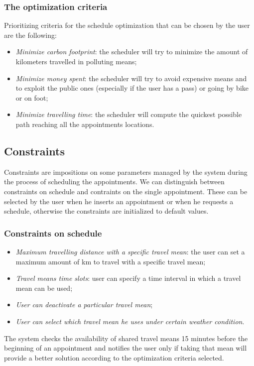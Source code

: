  
\subsubsection{The optimization criteria} \label{subsubsect:optcriteria} 
Prioritizing criteria for the schedule optimization that can be chosen by the user are the following:
\begin{itemize}
\item \textit{Minimize carbon footprint}: the scheduler will try to minimize the amount of kilometers travelled in polluting means;
\item \textit{Minimize money spent}: the scheduler will try to avoid expensive means and to exploit the public ones (especially if the user has a pass) or going by bike or on foot;
\item \textit{Minimize travelling time}: the scheduler will compute the quickest possible path reaching all the appointments locations.
\end{itemize}

\subsection{Constraints}
Constraints are impositions on some parameters managed by the system during the process of scheduling the appointments. We can distinguish between constraints on schedule and contraints on the single appointment. These can be selected by the user when he inserts an appointment or when he requests a schedule, otherwise the constraints are initialized to default values. 

\subsubsection{Constraints on schedule} 
\begin{itemize}
\item \textit{Maximum travelling distance with a specific travel mean}: the user can set a maximum amount of km to travel with a specific travel mean;
\item\textit{ Travel means time slots}: user can specify a time interval in which a travel mean can be used;
\item \textit{User can deactivate a particular travel mean};
\item \textit{User can select which travel mean he uses under certain weather condition}.
\end{itemize}

The system checks the availability of shared travel means 15 minutes before the beginning of an appointment and notifies the user only if taking that mean will provide a better solution according to the optimization criteria selected.

